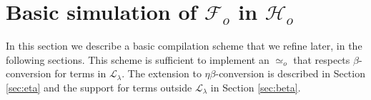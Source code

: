 \documentclass[sigconf,natbib=false,review]{acmart}
\newcommand{\UnifRel}{\ensuremath{\simeq}}
\newcommand{\Uo}{\ensuremath{\UnifRel_o}\xspace}
\newcommand{\llambda}{\ensuremath{\mathcal{L}_\lambda}\xspace}
\newcommand{\Fo}{\ensuremath{\mathcal{F}_{\!o}\xspace}} %
\newcommand{\Ho}{\ensuremath{\mathcal{H}_o}\xspace}
\begin{document}






\section[Compilation: fo\_tm to tm]{Basic simulation of \Fo{} in \Ho{}}
\label{sec:simulation}

In this section we describe a basic compilation scheme that we refine
later, in the following sections. This scheme is sufficient to implement
an \Uo{} that respects $\beta$-conversion for terms in \llambda. The extension to
$\eta\beta$-conversion is described in Section \ref{sec:eta} and the support
for terms outside \llambda in Section \ref{sec:beta}.
\end{document}
